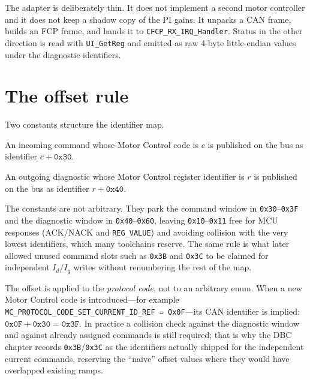 The adapter is deliberately thin. It does not implement a second motor
controller and it does not keep a shadow copy of the PI gains. It unpacks
a CAN frame, builds an FCP frame, and hands it to
\texttt{CFCP\_RX\_IRQ\_Handler}. Status in the other direction is read with
\texttt{UI\_GetReg} and emitted as raw 4-byte little-endian values under
the diagnostic identifiers.

\section{The offset rule}
\label{sec:offset}

Two constants structure the identifier map.

\begin{definition}
An incoming command whose Motor Control code is $c$ is published on the
bus as identifier $c + \mathtt{0x30}$.
\end{definition}

\begin{definition}
An outgoing diagnostic whose Motor Control register identifier is $r$ is
published on the bus as identifier $r + \mathtt{0x40}$.
\end{definition}

The constants are not arbitrary. They park the command window in
\texttt{0x30}--\texttt{0x3F} and the diagnostic window in
\texttt{0x40}--\texttt{0x60}, leaving \texttt{0x10}--\texttt{0x11} free for
MCU responses (ACK/NACK and \texttt{REG\_VALUE}) and avoiding collision
with the very lowest identifiers, which many toolchains reserve. The same
rule is what later allowed unused command slots such as \texttt{0x3B} and
\texttt{0x3C} to be claimed for independent $I_d$/$I_q$ writes without
renumbering the rest of the map.

\begin{remark}
The offset is applied to the \emph{protocol code}, not to an arbitrary
enum. When a new Motor Control code is introduced---for example
\texttt{MC\_PROTOCOL\_CODE\_SET\_CURRENT\_ID\_REF = 0x0F}---its CAN
identifier is implied: $\mathtt{0x0F}+\mathtt{0x30}=\mathtt{0x3F}$. In
practice a collision check against the diagnostic window and against
already assigned commands is still required; that is why the DBC chapter
records \texttt{0x3B}/\texttt{0x3C} as the identifiers actually shipped
for the independent current commands, reserving the ``naive'' offset
values where they would have overlapped existing ramps.
\end{remark}

